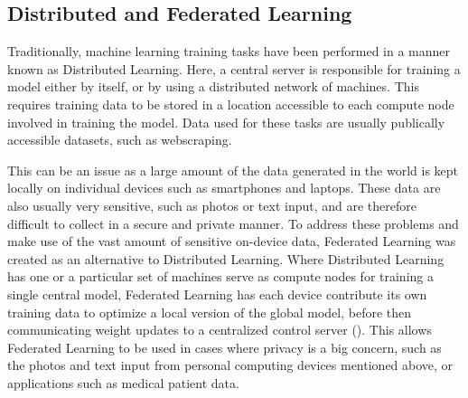\subsection{Distributed and Federated Learning}

Traditionally, machine learning training tasks have been performed in a manner known as Distributed Learning. Here, a central server is responsible for training a model either by itself, or by using a distributed network of machines. This requires training data to be stored in a location accessible to each compute node involved in training the model. Data used for these tasks are usually publically accessible datasets, such as webscraping.

This can be an issue as a large amount of the data generated in the world is kept locally on individual devices such as smartphones and laptops. These data are also usually very sensitive, such as photos or text input, and are therefore difficult to collect in a secure and private manner. To address these problems and make use of the vast amount of sensitive on-device data, Federated Learning was created as an alternative to Distributed Learning. Where Distributed Learning has one or a particular set of machines serve as compute nodes for training a single central model, Federated Learning has each device contribute its own training data to optimize a local version of the global model, before then communicating weight updates to a centralized control server (\cite{DBLP:journals/corr/McMahanMRA16}). This allows Federated Learning to be used in cases where privacy is a big concern, such as the photos and text input from personal computing devices mentioned above, or applications such as medical patient data.